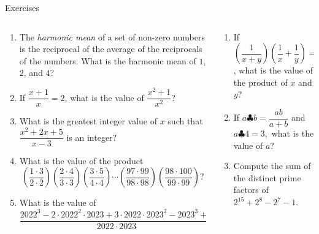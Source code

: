 \documentclass[9pt,aspectratio=169]{beamer}
\begin{document}
\begin{frame}{Exercises}
  \begin{columns}[T]
    \begin{column}{0.5\textwidth}
      \begin{enumerate}
        \item The \emph{harmonic mean} of a set of non-zero numbers is the reciprocal of the average of the reciprocals of the numbers. What is the harmonic mean of $1$, $2$, and $4$? %
        \item If $\dfrac{x+1}{x} = 2$, what is the value of $\dfrac{x^2 + 1}{x^2}$?
        \item What is the greatest integer value of $x$ such that $\dfrac{x^2 + 2x + 5}{x-3}$ is an integer?
        \item What is the value of the product\[\left(\frac{1\cdot3}{2\cdot2}\right)\left(\frac{2\cdot4}{3\cdot3}\right)\left(\frac{3\cdot5}{4\cdot4}\right)\cdots\left(\frac{97\cdot99}{98\cdot98}\right)\left(\frac{98\cdot100}{99\cdot99}\right)?\] %
        \item What is the value of \[\frac{2022^3 - 2 \cdot 2022^2 \cdot 2023 + 3 \cdot 2022 \cdot 2023^2 - 2023^3 + 1}{2022 \cdot 2023}?\]
        \seti
      \end{enumerate}
    \end{column}
    \begin{column}{0.5\textwidth}
      \begin{enumerate}
        \conti
        \item If $\left(\dfrac1{x+y}\right)\left(\dfrac1x+\dfrac1y\right)=\dfrac1{13}$, what is the value of the product of $x$ and $y$?
        \item If $a\clubsuit b=\dfrac{ab}{a+b}$ and $a\clubsuit 4=3,$ what is the value of $a$?
        \item Compute the sum of the distinct prime factors of
        $2^{15} + 2^8 − 2^7 − 1$. %
      \end{enumerate}
    \end{column}
  \end{columns}
\end{frame}
\end{document}
